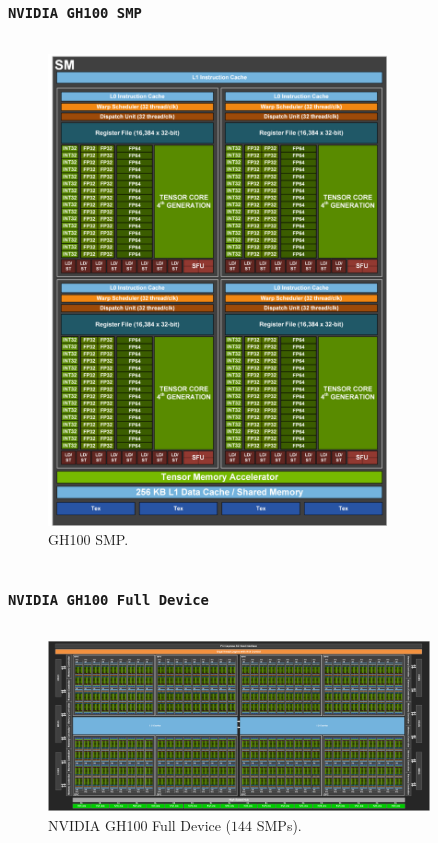 \begin{frame}
	\frametitle{\texttt{NVIDIA GH100 SMP}} 
    \begin{columns}
    \begin{figure}[H]
       \centering
	    \includegraphics[width=0.80\textwidth]{./img/H100-Streaming-Multiprocessor-SM-1104x1536.png}
	    \caption{\small{GH100 SMP.}}
     \end{figure}
     \end{columns}
\end{frame}

\begin{frame}
        \frametitle{\texttt{NVIDIA GH100 Full Device}}
    \begin{columns}
    \begin{figure}[H]
       \centering
	    \includegraphics[width=0.90\textwidth]{./img/Full-H100-GPU-with-144-SMs-1536x686.png}
	    \caption{\small{NVIDIA GH100 Full Device ($144$ SMPs).}}
     \end{figure}
     \end{columns}
\end{frame}
